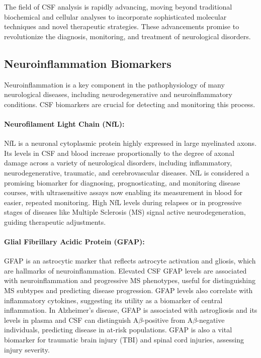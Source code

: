	The field of CSF analysis is rapidly advancing, moving beyond traditional biochemical and cellular analyses to incorporate sophisticated molecular techniques and novel therapeutic strategies. These advancements promise to revolutionize the diagnosis, monitoring, and treatment of neurological disorders.
	
	\subsection*{Neuroinflammation Biomarkers}
	
	Neuroinflammation is a key component in the pathophysiology of many neurological diseases, including neurodegenerative and neuroinflammatory conditions. CSF biomarkers are crucial for detecting and monitoring this process.
	
	\paragraph{Neurofilament Light Chain (NfL):} NfL is a neuronal cytoplasmic protein highly expressed in large myelinated axons. Its levels in CSF and blood increase proportionally to the degree of axonal damage across a variety of neurological disorders, including inflammatory, neurodegenerative, traumatic, and cerebrovascular diseases. NfL is considered a promising biomarker for diagnosing, prognosticating, and monitoring disease courses, with ultrasensitive assays now enabling its measurement in blood for easier, repeated monitoring. High NfL levels during relapses or in progressive stages of diseases like Multiple Sclerosis (MS) signal active neurodegeneration, guiding therapeutic adjustments.
	
	\paragraph{Glial Fibrillary Acidic Protein (GFAP):} GFAP is an astrocytic marker that reflects astrocyte activation and gliosis, which are hallmarks of neuroinflammation. Elevated CSF GFAP levels are associated with neuroinflammation and progressive MS phenotypes, useful for distinguishing MS subtypes and predicting disease progression. GFAP levels also correlate with inflammatory cytokines, suggesting its utility as a biomarker of central inflammation. In Alzheimer's disease, GFAP is associated with astrogliosis and its levels in plasma and CSF can distinguish A$\beta$-positive from A$\beta$-negative individuals, predicting disease in at-risk populations. GFAP is also a vital biomarker for traumatic brain injury (TBI) and spinal cord injuries, assessing injury severity.
	
